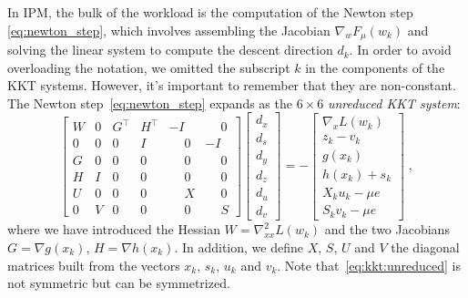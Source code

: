 In IPM, the bulk of the workload is the computation of the Newton
step \eqref{eq:newton_step}, which involves assembling the Jacobian
$\nabla_w F_\mu(w_k)$ and solving the linear system to compute
the descent direction $d_k$.
In order to avoid overloading the notation, we omitted the subscript $k$ in the components of the KKT systems. However, it's important to remember that they are non-constant.
The Newton step~\eqref{eq:newton_step} expands as the $6 \times 6$
\emph{unreduced KKT system}:
\begin{equation}
  \label{eq:kkt:unreduced}
  \tag{$K_3$}
  \begin{bmatrix}
    W & 0 & G^\top           & H^\top           & -I           & \phantom{-}0 \\
    0 & 0 & 0\phantom{^\top} & I\phantom{^\top} & \phantom{-}0 & -I           \\
    G & 0 & 0\phantom{^\top} & 0\phantom{^\top} & \phantom{-}0 & \phantom{-}0 \\
    H & I & 0\phantom{^\top} & 0\phantom{^\top} & \phantom{-}0 & \phantom{-}0 \\
    U & 0 & 0\phantom{^\top} & 0\phantom{^\top} & \phantom{-}X & \phantom{-}0 \\
    0 & V & 0\phantom{^\top} & 0\phantom{^\top} & \phantom{-}0 & \phantom{-}S
  \end{bmatrix}
  \begin{bmatrix}
    d_x \\
    d_s \\
    d_y \\
    d_z \\
    d_u \\
    d_v
  \end{bmatrix}
  = - \begin{bmatrix}
    \nabla_x L(w_k) \\
       z_k - v_k  \\
       g(x_k)  \\
       h(x_k) + s_k  \\
       X_k u_k - \mu e  \\
       S_k v_k - \mu e
  \end{bmatrix} \; ,
\end{equation}
where we have introduced the Hessian $W = \nabla^2_{x x} L(w_k)$ and
the two Jacobians $G = \nabla g(x_k)$, $H = \nabla h(x_k)$.
In addition, we define $X$, $S$, $U$ and $V$ the diagonal matrices built from the vectors $x_k$, $s_k$, $u_k$ and $v_k$.
Note that~\eqref{eq:kkt:unreduced} is not symmetric but can be symmetrized.

